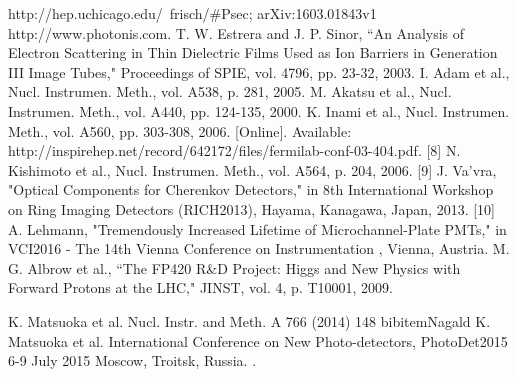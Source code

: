  http://hep.uchicago.edu/~frisch/#Psec; arXiv:1603.01843v1
 http://www.photonis.com.
 T. W. Estrera and J. P. Sinor, ``An Analysis of Electron Scattering in Thin Dielectric Films Used as Ion Barriers in Generation III Image Tubes," Proceedings of SPIE, vol. 4796, pp. 23-32, 2003. 
I. Adam et al., Nucl. Instrumen. Meth., vol. A538, p. 281, 2005. 
M. Akatsu et al., Nucl. Instrumen. Meth., vol. A440, pp. 124-135, 2000. 
K. Inami et al., Nucl. Instrumen. Meth., vol. A560, pp. 303-308, 2006. 
[Online]. Available: http://inspirehep.net/record/642172/files/fermilab-conf-03-404.pdf.
[8] 
N. Kishimoto et al., Nucl. Instrumen. Meth., vol. A564, p. 204, 2006. 
[9] 
J. Va'vra, "Optical Components for Cherenkov Detectors," in 8th International Workshop on Ring Imaging Detectors (RICH2013), Hayama, Kanagawa, Japan, 2013. 
[10] 
A. Lehmann, "Tremendously Increased Lifetime of Microchannel-Plate PMTs," in VCI2016 - The 14th Vienna Conference on Instrumentation , Vienna, Austria.
M. G. Albrow et al., ``The FP420 R\&D Project: Higgs and New Physics with Forward Protons at the LHC," JINST, vol. 4, p. T10001, 2009. 


 K. Matsuoka et al.  Nucl. Instr. and Meth. A 766 (2014) 148 bibitem{Nagald} K. Matsuoka et al.  International Conference on New Photo-detectors, PhotoDet2015 6-9 July 2015 Moscow, Troitsk, Russia.
.
